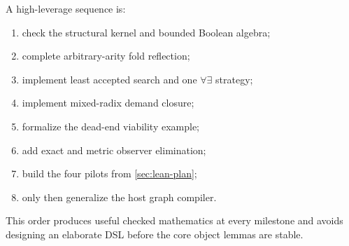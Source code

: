 A high-leverage sequence is:

\begin{enumerate}
\item check the structural kernel and bounded Boolean algebra;
\item complete arbitrary-arity fold reflection;
\item implement least accepted search and one \(\forall\exists\) strategy;
\item implement mixed-radix demand closure;
\item formalize the dead-end viability example;
\item add exact and metric observer elimination;
\item build the four pilots from \cref{sec:lean-plan};
\item only then generalize the host graph compiler.
\end{enumerate}

This order produces useful checked mathematics at every milestone and avoids designing an elaborate DSL before the core object lemmas are stable.
